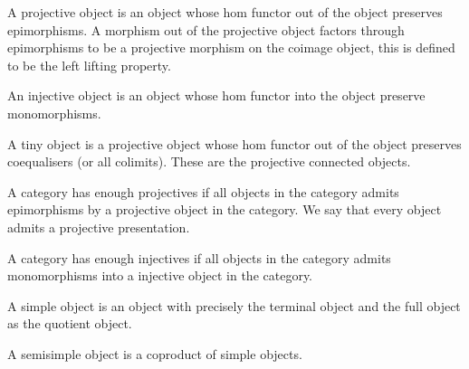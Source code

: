 \begin{definition}
    \label{definition-projective-object}
    A projective object is an object whose hom functor out of the object preserves epimorphisms. A morphism out of the projective object factors through epimorphisms to be a projective morphism on the coimage object, this is defined to be the left lifting property.
\end{definition}

\begin{definition}
    \label{definition-injective-object}
    An injective object is an object whose hom functor into the object preserve monomorphisms.
\end{definition}

\begin{definition}
    \label{definition-tiny-object}
    A tiny object is a projective object whose hom functor out of the object preserves coequalisers (or all colimits). These are the projective connected objects.
\end{definition}

\begin{definition}
    \label{definition-enough-projectives}
    A category has enough projectives if all objects in the category admits epimorphisms by a projective object in the category. We say that every object admits a projective presentation.
\end{definition}

\begin{definition}
    \label{definition-enough-injectives}
    A category has enough injectives if all objects in the category admits monomorphisms into a injective object in the category.
\end{definition}

\begin{definition}
    \label{definition-simple-object}
    A simple object is an object with precisely the terminal object and the full object as the quotient object.
\end{definition}

\begin{definition}
    \label{definition-semisimple-object}
    A semisimple object is a coproduct of simple objects.
\end{definition}


